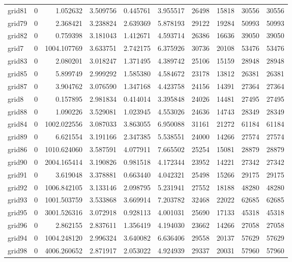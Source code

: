 \begin{longtable}{|l|r|r|r|r|r|r|r|r|r|}
grid81 & 0 & 1.052632 & 3.509756 & 0.445761 & 3.955517 & 26498 & 15818 & 30556 & 30556 \\
grid79 & 0 & 2.368421 & 3.238824 & 2.639369 & 5.878193 & 29122 & 19284 & 50993 & 50993 \\
grid82 & 0 & 0.759398 & 3.181043 & 1.412671 & 4.593714 & 26386 & 16636 & 39050 & 39050 \\
grid7 & 0 & 1004.107769 & 3.633751 & 2.742175 & 6.375926 & 30736 & 20108 & 53476 & 53476 \\
grid83 & 0 & 2.080201 & 3.018247 & 1.371495 & 4.389742 & 25106 & 15159 & 28948 & 28948 \\
grid85 & 0 & 5.899749 & 2.999292 & 1.585380 & 4.584672 & 23178 & 13812 & 26381 & 26381 \\
grid87 & 0 & 3.904762 & 3.076590 & 1.347168 & 4.423758 & 24156 & 14391 & 27364 & 27364 \\
grid8 & 0 & 0.157895 & 2.981834 & 0.414014 & 3.395848 & 24026 & 14481 & 27495 & 27495 \\
grid88 & 0 & 1.090226 & 3.529081 & 1.023945 & 4.553026 & 24636 & 14743 & 28349 & 28349 \\
grid84 & 0 & 1002.022556 & 3.087033 & 3.863055 & 6.950088 & 31161 & 21272 & 61184 & 61184 \\
grid89 & 0 & 6.621554 & 3.191166 & 2.347385 & 5.538551 & 24000 & 14266 & 27574 & 27574 \\
grid86 & 0 & 1010.624060 & 3.587591 & 4.077911 & 7.665502 & 25254 & 15081 & 28879 & 28879 \\
grid90 & 0 & 2004.165414 & 3.190826 & 0.981518 & 4.172344 & 23952 & 14221 & 27342 & 27342 \\
grid91 & 0 & 3.619048 & 3.378881 & 0.663440 & 4.042321 & 25498 & 15266 & 29175 & 29175 \\
grid92 & 0 & 1006.842105 & 3.133146 & 2.098795 & 5.231941 & 27552 & 18188 & 48280 & 48280 \\
grid93 & 0 & 1001.503759 & 3.533868 & 3.669914 & 7.203782 & 32468 & 22022 & 62685 & 62685 \\
grid95 & 0 & 3001.526316 & 3.072918 & 0.928113 & 4.001031 & 25690 & 17133 & 45318 & 45318 \\
grid96 & 0 & 2.862155 & 2.837611 & 1.356419 & 4.194030 & 23662 & 14266 & 27058 & 27058 \\
grid94 & 0 & 1004.248120 & 2.996324 & 3.640082 & 6.636406 & 29558 & 20137 & 57629 & 57629 \\
grid98 & 0 & 4006.260652 & 2.871917 & 2.053022 & 4.924939 & 29337 & 20031 & 57960 & 57960 \\

\end{longtable}
